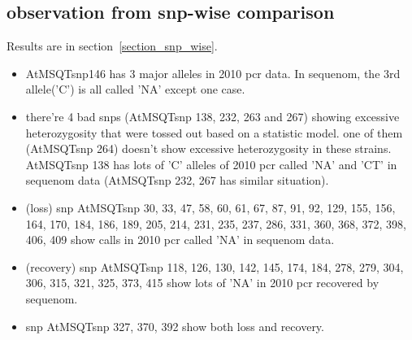 \documentclass[a4paper,10pt]{article}
\begin{document}
\subsection{observation from snp-wise comparison}
Results are in section~\ref{section_snp_wise}.

\begin{itemize}
 \item AtMSQTsnp146 has 3 major alleles in 2010 pcr data. In sequenom, the 3rd allele('C') is all called 'NA' except one case.
\item there're 4 bad snps (AtMSQTsnp 138, 232, 263 and 267) showing excessive heterozygosity that were tossed out based on a statistic model. one of them (AtMSQTsnp 264) doesn't show excessive heterozygosity in these strains. AtMSQTsnp 138 has lots of 'C' alleles of 2010 pcr called 'NA' and 'CT' in sequenom data (AtMSQTsnp 232, 267 has similar situation).
\item (loss) snp AtMSQTsnp 30, 33, 47, 58, 60, 61, 67, 87, 91, 92, 129, 155, 156, 164, 170, 184, 186, 189, 205, 214, 231, 235, 237, 286, 331, 360, 368, 372, 398, 406, 409 show calls in 2010 pcr called 'NA' in sequenom data.
\item (recovery) snp AtMSQTsnp 118, 126, 130, 142, 145, 174, 184, 278, 279, 304, 306, 315, 321, 325, 373, 415 show lots of 'NA' in 2010 pcr recovered by sequenom.
\item snp AtMSQTsnp 327, 370, 392 show both loss and recovery.

\end{itemize}




\end{document}

